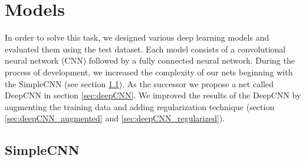\documentclass[a4paper]{article}
\begin{document}
\section{Models}

In order to solve this task, we designed various deep learning models and evaluated them using the test dataset. Each model consists of a convolutional neural network (CNN) followed by a fully connected neural network. During the process of development, we increased the complexity of our nets beginning with the SimpleCNN (see section \ref{sec:simpleCNN}). As the successor we propose a net called  DeepCNN in section \ref{sec:deepCNN}. We improved the results of the DeepCNN by augmenting the training data and adding regularization technique (section \ref{sec:deepCNN_augmented} and \ref{sec:deepCNN_regularized}).

\subsection{SimpleCNN}\label{sec:simpleCNN}
\end{document}
